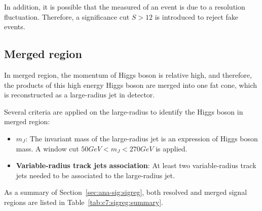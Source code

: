\par In addition, it is possible that the measured \met of an event is due to a resolution fluctuation. Therefore, a \met significance cut $S>12$ is introduced to reject fake \met events.

\subsection{Merged region}

\par In merged region, the momentum of Higgs boson is relative high, and therefore, the products of this high energy Higgs boson are merged into one fat cone, which is reconstructed as a large-radius jet in detector.
\par Several criteria are applied on the large-radius to identify the Higgs boson in merged region:
\begin{itemize}
    \item \textbf{$m_{J}$}: The invariant mass of the large-radius jet is an expression of Higgs boson mass. A window cut $50GeV<m_{J}<270GeV$ is applied.
    \item \textbf{Variable-radius track jets association}: At least two variable-radius track jets needed to be associated to the large-radius jet.
\end{itemize}

\par As a summary of Section~\ref{sec:ana-sig:sigreg}, both resolved and merged signal regions are listed in Table~\ref{tab:c7:sigreg:summary}.

